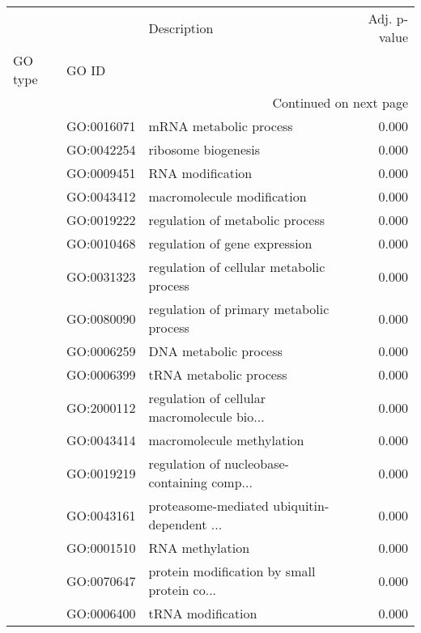 \begin{longtable}{lllr}
\toprule
   &            &                                  Description &  Adj. p-value \\
GO type & GO ID &                                              &               \\
\midrule
\endhead
\midrule
\multicolumn{4}{r}{{Continued on next page}} \\
\midrule
\endfoot

\bottomrule
\endlastfoot
\multirow{204}{*}{BP} & GO:0016071 &                       mRNA metabolic process &         0.000 \\
   & GO:0042254 &                          ribosome biogenesis &         0.000 \\
   & GO:0009451 &                             RNA modification &         0.000 \\
   & GO:0043412 &                   macromolecule modification &         0.000 \\
   & GO:0019222 &              regulation of metabolic process &         0.000 \\
   & GO:0010468 &                regulation of gene expression &         0.000 \\
   & GO:0031323 &     regulation of cellular metabolic process &         0.000 \\
   & GO:0080090 &      regulation of primary metabolic process &         0.000 \\
   & GO:0006259 &                        DNA metabolic process &         0.000 \\
   & GO:0006399 &                       tRNA metabolic process &         0.000 \\
   & GO:2000112 &  regulation of cellular macromolecule bio... &         0.000 \\
   & GO:0043414 &                    macromolecule methylation &         0.000 \\
   & GO:0019219 &  regulation of nucleobase-containing comp... &         0.000 \\
   & GO:0043161 &  proteasome-mediated ubiquitin-dependent ... &         0.000 \\
   & GO:0001510 &                              RNA methylation &         0.000 \\
   & GO:0070647 &  protein modification by small protein co... &         0.000 \\
   & GO:0006400 &                            tRNA modification &         0.000 \\

\end{longtable}
